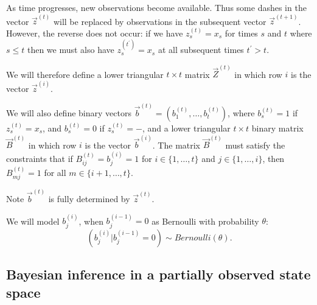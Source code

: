 As time progresses, new observations become available. Thus some dashes in the vector $\vec{z}^{(t)}$ will be replaced by observations in the subsequent vector $\vec{z}^{(t+1)}$. However, the reverse does not occur: if we have $z_s^{(t)} = x_s$ for times $s$ and $t$ where $s \leq t$ then we must also have $z_s^{(t^{\prime})} = x_s$ at all subsequent times $t^{\prime} > t$.

We will therefore define a lower triangular $t \times t$ matrix $\vec{Z}^{(t)}$ in which row $i$ is the vector $\vec{z}^{(i)}$.

We will also define binary vectors $\vec{b}^{(t)} = (b_1^{(t)}, \dots, b_{t}^{(t)})$, where $b_s^{(t)} = 1$ if $z_s^{(t)} = x_s$, and $b_s^{(t)} = 0$ if $z_s^{(t)} = -$, and a lower triangular $t \times t$ binary matrix $\vec{B}^{(t)}$ in which row $i$ is the vector $\vec{b}^{(i)}$.
The matrix $\vec{B}^{(t)}$ must satisfy the constraints that if $B_{ij}^{(t)} = b_j^{(i)} = 1$ for $i \in \{ 1, \ldots, t \}$ and $j \in \{ 1, \ldots, i \}$, then $B_{mj}^{(t)} = 1$ for all $m \in \{ i+1, \ldots, t \}$.

Note $\vec{b}^{(t)}$ is fully determined by $\vec{z}^{(t)}$.

We will model $b_j^{(i)}$, when $b_j^{(i-1)} = 0$ as Bernoulli with probability $\theta$:
\[
(b_j^{(i)} | b_j^{(i-1)} = 0) \sim Bernoulli(\theta).
\]




\subsection{Bayesian inference in a partially observed state space}

